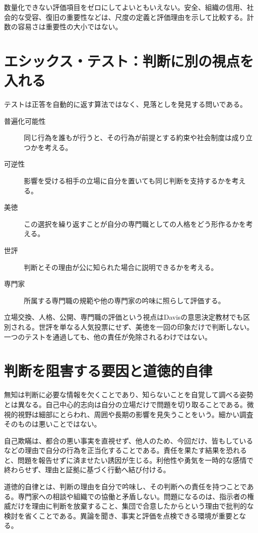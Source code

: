 数量化できない評価項目をゼロにしてよいともいえない。安全、組織の信用、社会的な受容、復旧の重要性などは、尺度の定義と評価理由を示して比較する。計数の容易さは重要性の大小ではない。

\section{エシックス・テスト：判断に別の視点を入れる}
\label{theory:ethics:tests}
テストは正答を自動的に返す算法ではなく、見落としを発見する問いである。
\begin{description}
 \item[普遍化可能性] 同じ行為を誰もが行うと、その行為が前提とする約束や社会制度は成り立つかを考える。
 \item[可逆性] 影響を受ける相手の立場に自分を置いても同じ判断を支持するかを考える。
 \item[美徳] この選択を繰り返すことが自分の専門職としての人格をどう形作るかを考える。
 \item[世評] 判断とその理由が公に知られた場合に説明できるかを考える。
 \item[専門家] 所属する専門職の規範や他の専門家の吟味に照らして評価する。
\end{description}
立場交換、人格、公開、専門職の評価という視点はDavisの意思決定教材でも区別される\parencite{davis_seven_steps}。世評を単なる人気投票にせず、美徳を一回の印象だけで判断しない。一つのテストを通過しても、他の責任が免除されるわけではない。

\section{判断を阻害する要因と道徳的自律}
\label{theory:ethics:obstacles}
無知は判断に必要な情報を欠くことであり、知らないことを自覚して調べる姿勢とは異なる。自己中心的志向は自分の立場だけで問題を切り取ることである。微視的視野は細部にとらわれ、周囲や長期の影響を見失うことをいう。細かい調査そのものは悪いことではない。

自己欺瞞は、都合の悪い事実を直視せず、他人のため、今回だけ、皆もしているなどの理由で自分の行為を正当化することである。責任を果たす結果を恐れると、問題を報告せずに済ませたい誘因が生じる。利他性や勇気を一時的な感情で終わらせず、理由と証拠に基づく行動へ結び付ける。

道徳的自律とは、判断の理由を自分で吟味し、その判断への責任を持つことである。専門家への相談や組織での協働と矛盾しない。問題になるのは、指示者の権威だけを理由に判断を放棄すること、集団で合意したからという理由で批判的な検討を省くことである。異論を聞き、事実と評価を点検できる環境が重要となる。

